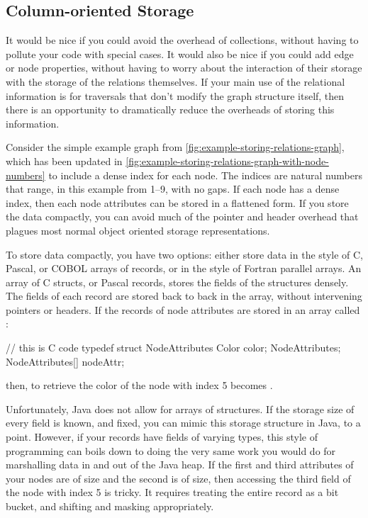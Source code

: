 

\subsection{Column-oriented Storage}
\label{sec:column-oriented}

It would be nice if you could avoid the overhead of collections, without having
to pollute your code with special cases. It would also be nice if you could add
edge or node properties, without having to worry about the interaction of their
storage with the storage of the relations themselves. If your main use of the
relational information is for traversals that don't modify the graph structure
itself, then there is an opportunity to dramatically reduce the overheads of
storing this information.

Consider the simple example graph from
\autoref{fig:example-storing-relations-graph}, which has been updated in
\autoref{fig:example-storing-relations-graph-with-node-numbers} to include a
dense index for each node. The indices are natural numbers that range, in this
example from 1--9, with no gaps. If each node has a dense index, then each node
attributes can be stored in a flattened form. If you store the data compactly,
you can avoid much of the pointer and header overhead that plagues most normal
object oriented storage representations.

To store data compactly, you have two options: either store data in the style of
C, Pascal, or COBOL arrays of records, or in the style of Fortran parallel
arrays. An array of C structs, or Pascal records, stores the fields of the structures
densely. The fields of each record are stored back to back in the array, without
intervening pointers or headers. If the records of node attributes are stored in
an array called :
\begin{shortlisting}
// this is C code
typedef struct NodeAttributes {
   Color color;
} NodeAttributes;
NodeAttributes[] nodeAttr;
\end{shortlisting}
then, to retrieve the color of the node
with index 5 becomes .

Unfortunately, Java does not allow for arrays of structures. If the storage size
of every field is known, and fixed, you can mimic this storage structure in Java,
to a point. However, if your records have fields of varying types, this style of
programming can boils down to doing the very same work you would do for
marshalling data in and out of the Java heap. If the first and third attributes
of your nodes are of  size and the second is of  size,
then accessing the third field of the node with index 5 is tricky. It requires
treating the entire record as a bit bucket, and shifting and masking
appropriately.

